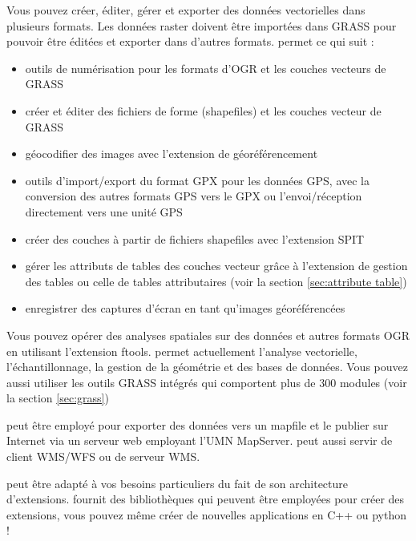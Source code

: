 
Vous pouvez créer, éditer, gérer et exporter des données vectorielles dans plusieurs formats. Les données raster doivent être importées dans GRASS pour pouvoir être éditées et exporter dans d'autres formats. \qg permet ce qui suit :  

\begin{itemize}[label=--]
\item outils de numérisation pour les formats d'OGR et les couches vecteurs de GRASS
\item créer et éditer des fichiers de forme (shapefiles) et les couches vecteur de GRASS
\item géocodifier des images avec l'extension de géoréférencement
\item outils d'import/export du format GPX pour les données GPS, avec la conversion des autres formats GPS vers le GPX ou l'envoi/réception directement vers une unité GPS
\item créer des couches \pg à partir de fichiers shapefiles avec l'extension SPIT
\item gérer les attributs de tables des couches vecteur grâce à l'extension de gestion des tables ou celle de tables attributaires (voir la section \ref{sec:attribute table})
\item enregistrer des captures d'écran en tant qu'images géoréférencées
\end{itemize}


Vous pouvez opérer des analyses spatiales sur des données \ppg et autres formats OGR en utilisant l'extension ftools. \qg permet actuellement l'analyse vectorielle, l'échantillonnage, la gestion de la géométrie et des bases de données. Vous pouvez aussi utiliser les outils GRASS intégrés qui comportent plus de 300 modules (voir la section \ref{sec:grass})


\qg peut être employé pour exporter des données vers un mapfile et le publier sur Internet via un serveur web employant l'UMN MapServer. \qg peut aussi servir de client WMS/WFS ou de serveur WMS.


\qg peut être adapté à vos besoins particuliers du fait de son architecture d'extensions. \qg fournit des bibliothèques qui peuvent être employées pour créer des extensions, vous pouvez même créer de nouvelles applications en C++ ou python !

